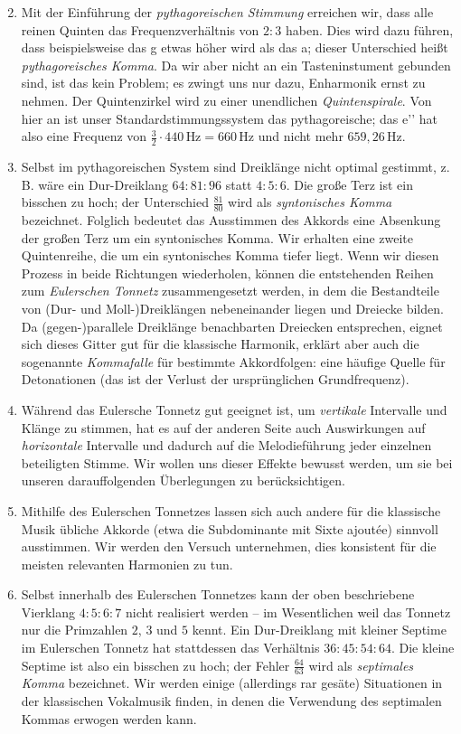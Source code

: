 \begin{enumerate}
  \setcounter{enumi}{1}
\item Mit der Einführung der \emph{pythagoreischen Stimmung} erreichen wir, dass
  alle reinen Quinten das Frequenzverhältnis von $2:3$ haben. Dies wird dazu
  führen, dass beispielsweise das \sharp g etwas höher wird als das \flat a;
  dieser Unterschied heißt \emph{pythagoreisches Komma}. Da wir aber nicht an
  ein Tasteninstument gebunden sind, ist das kein Problem; es zwingt uns nur
  dazu, Enharmonik ernst zu nehmen. Der Quintenzirkel wird zu einer unendlichen
  \emph{Quintenspirale}.  Von hier an ist unser Standardstimmungssystem das
  pythagoreische; das e’’ hat also eine Frequenz von
  $\frac32\cdot 440\,\text{Hz}=660\,\text{Hz}$ und nicht mehr
  $659{,}26\,\text{Hz}$.
\item Selbst im pythagoreischen System sind Dreiklänge nicht optimal gestimmt,
  z.\,B. wäre ein Dur-Dreiklang $64:81:96$ statt $4:5:6$. Die große Terz ist ein
  bisschen zu hoch; der Unterschied $\frac{81}{80}$ wird als \emph{syntonisches
    Komma} bezeichnet. Folglich bedeutet das Ausstimmen des Akkords eine
  Absenkung der großen Terz um ein syntonisches Komma. Wir erhalten eine zweite
  Quintenreihe, die um ein syntonisches Komma tiefer liegt. Wenn wir diesen
  Prozess in beide Richtungen wiederholen, können die entstehenden Reihen zum
  \emph{Eulerschen Tonnetz} zusammengesetzt werden, in dem die Bestandteile von
  (Dur- und Moll-)Dreiklängen nebeneinander liegen und Dreiecke bilden. Da
  \mbox{(gegen-)}parallele Dreiklänge benachbarten Dreiecken entsprechen, eignet
  sich dieses Gitter gut für die klassische Harmonik, erklärt aber auch die
  sogenannte \emph{Kommafalle} für bestimmte Akkordfolgen: eine häufige Quelle
  für Detonationen (das ist der Verlust der ursprünglichen Grundfrequenz).
\item Während das Eulersche Tonnetz gut geeignet ist, um \emph{vertikale}
  Intervalle und Klänge zu stimmen, hat es auf der anderen Seite auch
  Auswirkungen auf \emph{horizontale} Intervalle und dadurch auf die
  Melodieführung jeder einzelnen beteiligten Stimme.  Wir wollen uns dieser
  Effekte bewusst werden, um sie bei unseren darauffolgenden Überlegungen zu
  berücksichtigen.
\item Mithilfe des Eulerschen Tonnetzes lassen sich auch andere für die
  klassische Musik übliche Akkorde (etwa die Subdominante mit Sixte ajoutée)
  sinnvoll ausstimmen. Wir werden den Versuch unternehmen, dies konsistent für
  die meisten relevanten Harmonien zu tun.
\item Selbst innerhalb des Eulerschen Tonnetzes kann der oben beschriebene
  Vierklang $4:5:6:7$ nicht realisiert werden – im Wesentlichen weil das Tonnetz
  nur die Primzahlen $2$, $3$ und $5$ kennt. Ein Dur-Dreiklang mit kleiner
  Septime im Eulerschen Tonnetz hat stattdessen das Verhältnis $36:45:54:64$.
  Die kleine Septime ist also ein bisschen zu hoch; der Fehler $\frac{64}{63}$
  wird als \emph{septimales Komma} bezeichnet. Wir werden einige (allerdings rar
  gesäte) Situationen in der klassischen Vokalmusik finden, in denen die
  Verwendung des septimalen Kommas erwogen werden kann.
\end{enumerate}
